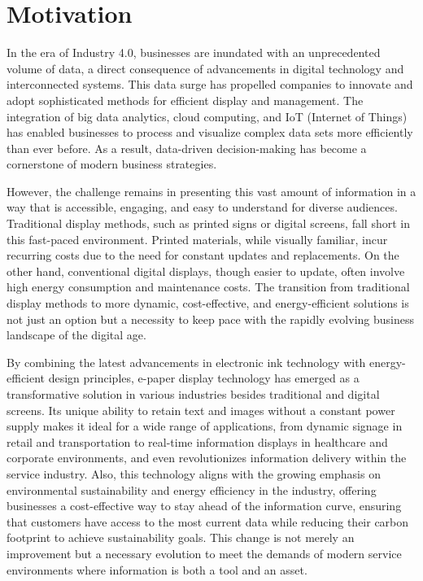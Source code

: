 \documentclass[../Main.tex]{subfiles}
\begin{document}
\section{Motivation}
\label{section:1.1}
In the era of Industry 4.0, businesses are inundated with an unprecedented volume of data, a direct consequence of advancements in digital technology and interconnected systems. This data surge has propelled companies to innovate and adopt sophisticated methods for efficient display and management. The integration of big data analytics, cloud computing, and IoT (Internet of Things) has enabled businesses to process and visualize complex data sets more efficiently than ever before. As a result, data-driven decision-making has become a cornerstone of modern business strategies.

However, the challenge remains in presenting this vast amount of information in a way that is accessible, engaging, and easy to understand for diverse audiences. Traditional display methods, such as printed signs or digital screens, fall short in this fast-paced environment. Printed materials, while visually familiar, incur recurring costs due to the need for constant updates and replacements. On the other hand, conventional digital displays, though easier to update, often involve high energy consumption and maintenance costs. The transition from traditional display methods to more dynamic, cost-effective, and energy-efficient solutions is not just an option but a necessity to keep pace with the rapidly evolving business landscape of the digital age. 

By combining the latest advancements in electronic ink technology with energy-efficient design principles, e-paper display technology has emerged as a transformative solution in various industries besides traditional and digital screens. Its unique ability to retain text and images without a constant power supply makes it ideal for a wide range of applications, from dynamic signage in retail and transportation to real-time information displays in healthcare and corporate environments, and even revolutionizes information delivery within the service industry. Also, this technology aligns with the growing emphasis on environmental sustainability and energy efficiency in the industry, offering businesses a cost-effective way to stay ahead of the information curve, ensuring that customers have access to the most current data while reducing their carbon footprint to achieve sustainability goals. This change is not merely an improvement but a necessary evolution to meet the demands of modern service environments where information is both a tool and an asset.
\end{document}
